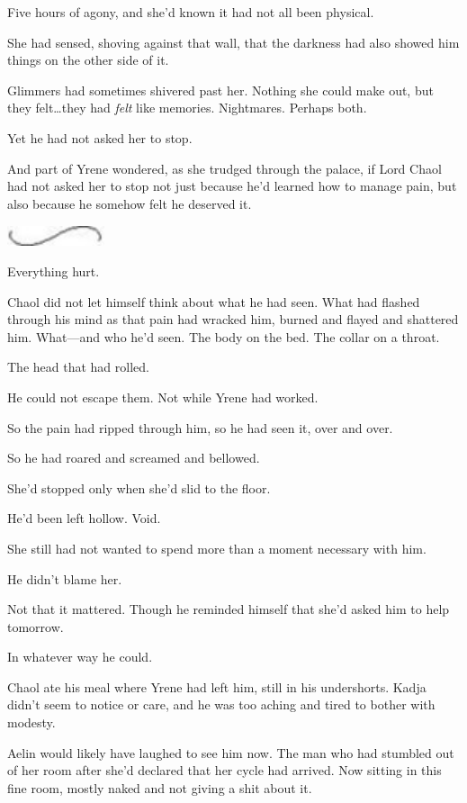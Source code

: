 Five hours of agony, and she'd known it had not all been physical.

She had sensed, shoving against that wall, that the darkness had also showed him things on the other side of it.

Glimmers had sometimes shivered past her.
Nothing she could make out, but they felt\ldots they had \emph{felt} like memories.
Nightmares.
Perhaps both.

Yet he had not asked her to stop.

And part of Yrene wondered, as she trudged through the palace, if Lord Chaol had not asked her to stop not just because he'd learned how to manage pain, but also because he somehow felt he deserved it.

\begin{center}
	\includegraphics[width=1.12in,height=0.24in]{images/seperator}
\end{center}

Everything hurt.

Chaol did not let himself think about what he had seen.
What had flashed through his mind as that pain had wracked him, burned and flayed and shattered him.
What---and who he'd seen.
The body on the bed.
The collar on a throat.

The head that had rolled.

He could not escape them.
Not while Yrene had worked.

So the pain had ripped through him, so he had seen it, over and over.

So he had roared and screamed and bellowed.

She'd stopped only when she'd slid to the floor.

He'd been left hollow.
Void.

She still had not wanted to spend more than a moment necessary with him.

He didn't blame her.

Not that it mattered.
Though he reminded himself that she'd asked him to help tomorrow.

In whatever way he could.

Chaol ate his meal where Yrene had left him, still in his undershorts.
Kadja didn't seem to notice or care, and he was too aching and tired to bother with modesty.

Aelin would likely have laughed to see him now.
The man who had stumbled out of her room after she'd declared that her cycle had arrived.
Now sitting in this fine room, mostly naked and not giving a shit about it.

